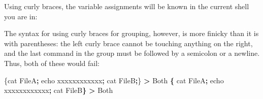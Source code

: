 \documentclass[]{krantz}
\makeatletter
\newenvironment{Shaded}{\begin{snugshade}}{\end{snugshade}}
\newcommand{\BuiltInTok}[1]{#1}
\newcommand{\CommentTok}[1]{\textcolor[rgb]{0.37,0.37,0.37}{\textit{#1}}}
\newcommand{\ExtensionTok}[1]{#1}
\newcommand{\FunctionTok}[1]{\textcolor[rgb]{0,0,0}{#1}}
\newcommand{\KeywordTok}[1]{\textcolor[rgb]{0.27,0.27,0.27}{\textbf{#1}}}
\newcommand{\NormalTok}[1]{#1}
\newcommand{\OperatorTok}[1]{\textcolor[rgb]{0.43,0.43,0.43}{\textbf{#1}}}
\newcommand{\VariableTok}[1]{\textcolor[rgb]{0,0,0}{#1}}
\newenvironment{kframe}{%
\medskip{}
\setlength{\fboxsep}{.8em}
 \def\at@end@of@kframe{}%
 \ifinner\ifhmode%
  \def\at@end@of@kframe{\end{minipage}}%
  \begin{minipage}{\columnwidth}%
 \fi\fi%
 \def\FrameCommand##1{\hskip\@totalleftmargin \hskip-\fboxsep
 \colorbox{shadecolor}{##1}\hskip-\fboxsep
     \hskip-\linewidth \hskip-\@totalleftmargin \hskip\columnwidth}%
 \MakeFramed {\advance\hsize-\width
   \@totalleftmargin\z@ \linewidth\hsize
   \@setminipage}}%
 {\par\unskip\endMakeFramed%
 \at@end@of@kframe}
\renewenvironment{Shaded}{\begin{kframe}}{\end{kframe}}
\makeatother
\begin{document}
\begin{Shaded}
\end{Shaded}

Using curly braces, the variable assignments will be known in
the current shell you are in:

\begin{Shaded}
\end{Shaded}

The syntax for using curly braces for grouping, however, is more finicky than
it is with parentheses: the left curly brace cannot be touching anything on the
right, and the last command in the group must be followed by a semicolon or a newline.
Thus, both of these would fail:

\begin{Shaded}
\begin{Highlighting}[]
\NormalTok{\{}\ExtensionTok{cat}\NormalTok{ FileA}\KeywordTok{;} \BuiltInTok{echo}\NormalTok{ xxxxxxxxxxxx}\KeywordTok{;} \FunctionTok{cat}\NormalTok{ FileB}\KeywordTok{;}\NormalTok{\} }\OperatorTok{>} \ExtensionTok{Both}
\KeywordTok{\{} \FunctionTok{cat}\NormalTok{ FileA}\KeywordTok{;} \BuiltInTok{echo}\NormalTok{ xxxxxxxxxxxx}\KeywordTok{;} \FunctionTok{cat}\NormalTok{ FileB}\KeywordTok{\}} \OperatorTok{>} \ExtensionTok{Both}
\end{Highlighting}
\end{Shaded}
\end{document}
